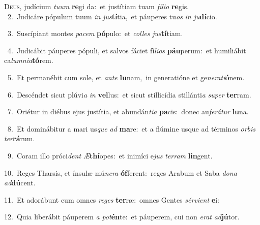 \lettrine{\initial\textcolor{\initialcolor}{D}}{eus,} judícium \textit{tu}\-\textit{um} \textbf{re}\-gi da:~\star et justítiam tuam \textit{fí}\-\textit{li}\textit{o} \textbf{re}\-gis.\\
{\numbfont\textcolor{\numbcolor}{~2.}}~Judicáre pópulum tuum \textit{in} \textit{jus}\-\textbf{tí}tia,~\star et páuperes tu\textit{os} \textit{in} \textit{ju}\-\textbf{dí}cio.\par
{\numbfont\textcolor{\numbcolor}{~3.}}~Suscípiant montes \textit{pa}\-\textit{cem} \textbf{pó}\-pulo:~\star et \textit{col}\-\textit{les} \textit{jus}\-\textbf{tí}tiam.\par
{\numbfont\textcolor{\numbcolor}{~4.}}~Judicábit páuperes pópuli, et salvos fáciet fí\-\textit{li}\-\textit{os} \textbf{páu}\-perum:~\star et humiliábit ca\-\textit{lum}\-\textit{ni}\textit{a}\textbf{tó}rem.\par
{\numbfont\textcolor{\numbcolor}{~5.}}~Et permanébit cum sole, et \textit{an}\-\textit{te} \textbf{lu}\-nam,~\star in generatióne et ge\-\textit{ne}\-\textit{ra}\textit{ti}\textbf{ó}nem.\par
{\numbfont\textcolor{\numbcolor}{~6.}}~Descéndet sicut plúvi\textit{a} \textit{in} \textbf{vel}\-lus:~\star et sicut stillicídia stillánti\textit{a} \textit{su}\-\textit{per} \textbf{ter}\-ram.\par
{\numbfont\textcolor{\numbcolor}{~7.}}~Oriétur in diébus ejus justítia, et abundán\-\textit{ti}\-\textit{a} \textbf{pa}\-cis:~\star donec au\-\textit{fe}\-\textit{rá}\textit{tur} \textbf{lu}\-na.\par
{\numbfont\textcolor{\numbcolor}{~8.}}~Et dominábitur a mari us\textit{que} \textit{ad} \textbf{ma}\-re:~\star et a flúmine usque ad términos \textit{or}\-\textit{bis} \textit{ter}\-\textbf{rá}rum.\par
{\numbfont\textcolor{\numbcolor}{~9.}}~Coram illo próci\textit{dent} \textit{Æ}\-\textbf{thí}opes:~\star et inimíci e\textit{jus} \textit{ter}\-\textit{ram} \textbf{lin}\-gent.\par
{\numbfont\textcolor{\numbcolor}{10.}}~Reges Tharsis, et ínsulæ mú\-\textit{ne}\-\textit{ra} \textbf{óf}\-ferent:~\star reges Arabum et Saba \textit{do}\-\textit{na} \textit{ad}\-\textbf{dú}cent.\par
{\numbfont\textcolor{\numbcolor}{11.}}~Et adorábunt eum omnes \textit{re}\-\textit{ges} \textbf{ter}\-ræ:~\star omnes Gentes \textit{sér}\-\textit{vi}\textit{ent} \textbf{e}\-i:\par
{\numbfont\textcolor{\numbcolor}{12.}}~Quia liberábit páuperem \textit{a} \textit{pot}\-\textbf{én}te:~\star et páuperem, cui non \textit{e}\-\textit{rat} \textit{ad}\-\textbf{jú}tor.\par
